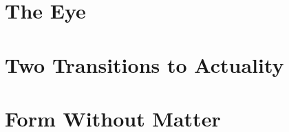 \documentclass[12pt]{article}
\begin{document}

\section{The Eye} %
\label{sec:the_eye}


\section{Two Transitions to Actuality} %
\label{sec:two_kinds_of_potentiality}


\section{Form Without Matter} %
\label{sec:form_without_matter}


\nocite{}

 
 
\end{document}

